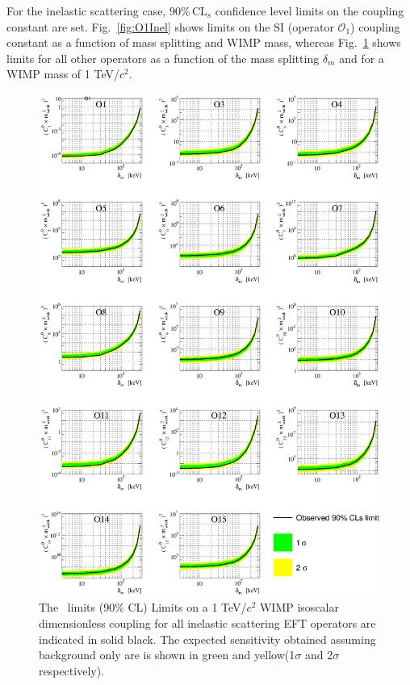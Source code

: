 For the inelastic scattering case, 90\%\,CL$_s$ confidence level limits on the  coupling constant are set. Fig.~\ref{fig:O1Inel} shows  limits on the SI (operator $\mathcal{O}_1$) coupling constant as a function of mass splitting and WIMP mass, whereas Fig.~\ref{fig:InelasticLimit} shows limits for all other operators as a function of the mass splitting $\delta_m$ and for a WIMP mass of 1 TeV/$c^2$.  



\begin{figure}
\begin{minipage}{1.\linewidth}
\centerline{\includegraphics[width=\textwidth,height=\textheight,keepaspectratio]{Figures/FinalInelastic.eps}}
\end{minipage}
\caption{The \Xehund\ limits (90\% CL) Limits on a 1 TeV/$c^2$ WIMP isoscalar dimensionless coupling for all inelastic scattering EFT operators are indicated in solid black. The expected sensitivity obtained assuming background only are is shown in green and yellow(1$\sigma$ and 2$\sigma$ respectively). }
\label{fig:InelasticLimit}
\end{figure}



